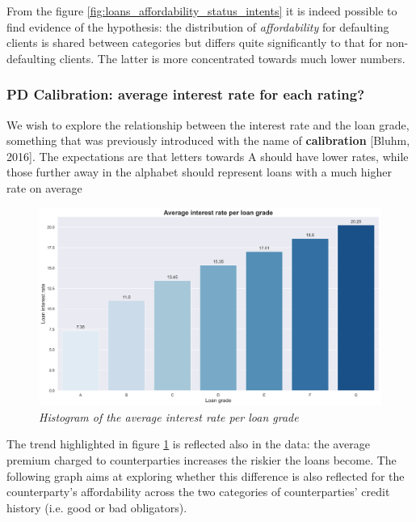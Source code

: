 \documentclass[a4paper,12pt]{article}
\begin{document}
    From the figure \ref{fig:loans_affordability_status_intents} it is indeed possible to find evidence of the hypothesis: 
    the distribution of \textit{affordability} for defaulting clients is shared between categories 
    but differs quite significantly to that for non-defaulting clients. The latter is more concentrated towards much lower numbers. 


    \subsubsection{PD Calibration: average interest rate for each rating?}
    We wish to explore the relationship between the interest rate and the loan grade, 
    something that was previously introduced with the name of \textbf{calibration} [Bluhm, 2016]. 
    The expectations are that letters towards A should have lower rates, while those further away in the alphabet 
    should represent loans with a much higher rate on average

        \begin{figure}[H]
            \centerline{
                \includegraphics[width=\linewidth]{./images/loans_pd_calibration_hist.png}
            }
            \caption{\textit{Histogram of the average interest rate per loan grade}}
            \label{fig:loans_pd_calibration_hist}
        \end{figure}
    
    The trend highlighted in figure \ref{fig:loans_pd_calibration_hist} is reflected also in the data: the average premium charged to counterparties 
    increases the riskier the loans become. The following graph aims at exploring whether this difference is 
    also reflected for the counterparty's affordability across the two categories of counterparties' credit history (i.e. good or bad obligators).
\end{document}
